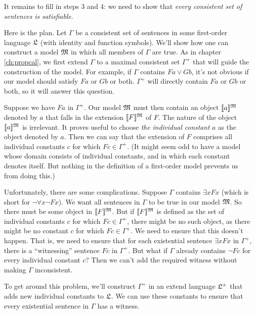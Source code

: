It remains to fill in steps 3 and 4:
we need to show that
\emph{every consistent set of sentences is satisfiable}.

Here is the plan.
Let $\Gamma$ be a consistent set of sentences in some first-order language $\mathfrak{L}$
(with identity and function symbols).
We'll show how one can construct a model $\mathfrak{M}$
in which all members of $\Gamma$ are true.
As in chapter \ref{ch:propcal},
we first extend $\Gamma$ to a maximal consistent set $\Gamma^{+}$
that will guide the construction of the model.
For example,
if $\Gamma$ contains $Fa \lor Gb$,
it's not obvious if
our model should satisfy $Fa$ or $Gb$ or both.
$\Gamma^{+}$ will directly contain $Fa$ or $Gb$ or both,
so it will answer this question.

Suppose we have $Fa$ in $\Gamma^{+}$.
Our model $\mathfrak{M}$ must then contain an object $\llbracket a\rrbracket^{\mathfrak{M}}$ denoted by $a$ that falls in the extension $\llbracket F \rrbracket^{\mathfrak{M}}$ of $F$.
The nature of the object $\llbracket a\rrbracket^{\mathfrak{M}}$ is irrelevant.
It proves useful to choose \emph{the individual constant} $a$ as the object denoted by $a$.
Then we can say
that the extension of $F$ comprises all individual constants $c$ for which $Fc \in \Gamma^{+}$.
(It might seem odd to have a model whose domain consists of individual constants,
and in which each constant denotes itself.
But nothing in the definition of a first-order model prevents us from doing this.)

Unfortunately,
there are some complications.
Suppose $\Gamma$ contains $\exists x Fx$
(which is short for $\neg \forall x \neg Fx$).
We want all sentences in $\Gamma$ to be true in our model $\mathfrak{M}$.
So there must be some object in $\llbracket F \rrbracket^{\mathfrak{M}}$.
But if $\llbracket F \rrbracket^{\mathfrak{M}}$ is defined as the set of individual constants $c$ for which $Fc \in \Gamma^{+}$,
there might be no such object,
as there might be no constant $c$ for which $Fc \in \Gamma^{+}$.
We need to ensure that this doesn't happen.
That is,
we need to ensure that
for each existential sentence $\exists x Fx$ in $\Gamma^{+}$,
there is a ``witnessing'' sentence $Fc$ in $\Gamma^{+}$.
But what if
$\Gamma$ already contains $\neg Fc$ for every individual constant $c$?
Then we can't add the required witness without making $\Gamma$ inconsistent.

To get around this problem,
we'll construct $\Gamma^{+}$ in an extend language $\mathfrak{L}^{+}$
that adds new individual constants to $\mathfrak{L}$.
We can use these constants to ensure that
every existential sentence in $\Gamma$ has a witness.

